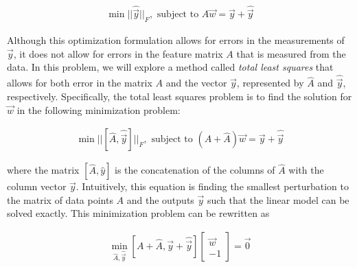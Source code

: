 \begin{align}
\min\lvert\lvert\hat{\vec{y}}\rvert\rvert_F,\text{ subject to }A\vec{w}=\vec{y}+\hat{\vec{y}}
\label{eq:ls_min}
\end{align}

Although this optimization formulation allows for errors in the measurements of $\vec{y}$, it does not allow for errors in the feature matrix $A$ that is measured from the data.  In this problem, we will explore a method called \emph{total least squares} that allows for both error in the matrix $A$ and the vector $\vec{y}$, represented by $\hat{A}$ and $\hat{\vec{y}}$, respectively.  Specifically, the total least squares problem is to find the solution for $\vec{w}$ in the following minimization problem:

\begin{align}
\min\lvert\lvert[\hat{A},\hat{\vec{y}}]\rvert\rvert_F,\text{ subject to }(A+\hat{A})\vec{w}=\vec{y}+\hat{\vec{y}}
\label{eq:tls_min}
\end{align}

where the matrix $[\hat{A},\hat{y}]$ is the concatenation of the columns of $\hat{A}$ with the column vector $\vec{y}$.  Intuitively, this equation is finding the smallest perturbation to the matrix of data points $A$ and the outputs $\vec{y}$ such that the linear model can be solved exactly. This minimization problem can be rewritten as

\begin{align}
\min_{\hat{A},\hat{\vec{y}}}[A+\hat{A},\vec{y}+\hat{\vec{y}}]\begin{bmatrix}\vec{w}\\-1\end{bmatrix}=\vec{0}
\label{eq:tls}
\end{align}

